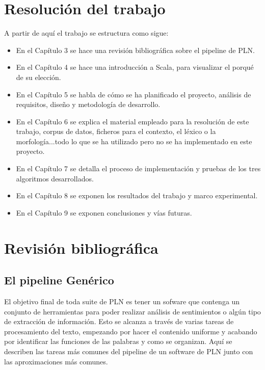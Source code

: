 \chapter*{Resolución del trabajo}
A partir de aquí el trabajo se estructura como sigue:
\begin{itemize}
\item En el \textcolor{SchoolColor}{Capítulo 3} se hace una revisión bibliográfica sobre el pipeline de PLN.
\item En el \textcolor{SchoolColor}{Capítulo 4} se hace una introducción a Scala, para visualizar el porqué de su elección.
\item En el \textcolor{SchoolColor}{Capítulo 5} se habla de cómo se ha planificado el proyecto, análisis de requisitos, diseño y metodología de desarrollo. 
\item En el \textcolor{SchoolColor}{Capítulo 6} se explica el material empleado para la resolución de este trabajo, corpus de datos, ficheros para el contexto, el léxico o la morfología...todo lo que se ha utilizado pero no se ha implementado en este proyecto.
\item En el \textcolor{SchoolColor}{Capítulo 7} se detalla el proceso de implementación y pruebas de los tres algoritmos desarrollados.
\item En el \textcolor{SchoolColor}{Capítulo 8} se exponen los resultados del trabajo y marco experimental.
\item En el \textcolor{SchoolColor}{Capítulo 9} se exponen conclusiones y vías futuras.
\end{itemize}
\chapter{Revisión bibliográfica}
\section{El pipeline Genérico}
El objetivo final de toda suite de PLN es tener un sofware que contenga un conjunto de herramientas para poder realizar análisis de sentimientos o algún tipo de extracción de información. Esto se alcanza a través de varias tareas de procesamiento del texto, empezando por hacer el contenido uniforme y acabando por identificar las funciones de las palabras y como se organizan. Aquí se describen las tareas más comunes del pipeline de un software de PLN junto con las aproximaciones más comunes. \newline
